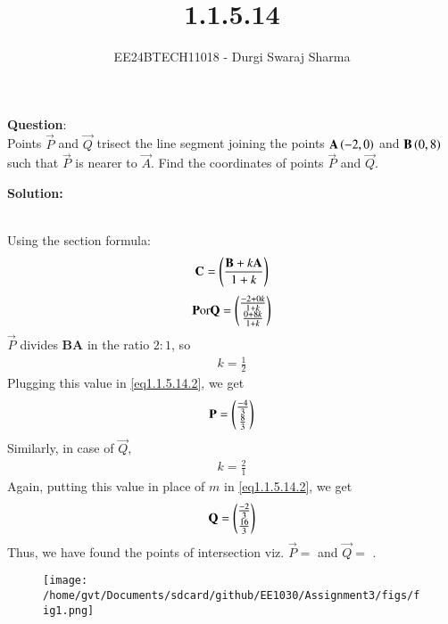 \documentclass[journal]{IEEEtran}
\begin{document}

\vspace{3cm}

\title{1.1.5.14}
\author{EE24BTECH11018 - Durgi Swaraj Sharma
}
{\let\newpage\relax\maketitle}

\renewcommand{\thefigure}{\theenumi}
\renewcommand{\thetable}{\theenumi}
\setlength{\intextsep}{10pt} %


\renewcommand{\thetable}{\theenumi}


 \textbf{Question}:\\
Points $\vec{P}$ and $\vec{Q}$ trisect the line segment joining the points $\mathbf{A}\left(-2, 0\right)$ and $\mathbf{B}\left(0, 8\right)$ such that $\vec{P}$ is nearer to $\vec{A}$. Find the coordinates of points $\vec{P}$ and $\vec{Q}$. \hfill {}

\textbf{Solution: }\\
    \begin{table}[h!]    
      \centering
      
      \caption{}
    \end{table}\\
 Using the section formula:
\begin{align}
	\mathbf{C} = \left(\frac{\mathbf{B}+k\mathbf{A}}{1+k}\right) \label{eq1.1.5.14.1}
\end{align}
\begin{align}
	\mathbf{P} \text{or} \mathbf{Q} = \begin{pmatrix}\frac{-2+0k}{1+k} \\ \frac{0+8k}{1+k}\end{pmatrix} \label{eq1.1.5.14.2}
\end{align}
$\vec{P}$ divides \textbf{BA} in the ratio $2:1$, so 
\begin{align}
	k = \frac{1}{2}
\end{align}
Plugging this value in \ref{eq1.1.5.14.2}, we get
\begin{align}
	\mathbf{P} = \begin{pmatrix}\frac{-4}{3} \\ \frac{8}{3}\end{pmatrix}
\end{align}
Similarly, in case of $\vec{Q}$,
\begin{align}
	k = \frac{2}{1}
\end{align}
Again, putting this value in place of $m$ in \ref{eq1.1.5.14.2}, we get
\begin{align}
	\mathbf{Q} = \begin{pmatrix}\frac{-2}{3} \\ \frac{16}{3}\end{pmatrix}
\end{align}
Thus, we have found the points of intersection viz. $\vec{P} =$  and $\vec{Q} =$ . 


    \begin{figure}[h]
        \centering
       \texttt{[image: /home/gvt/Documents/sdcard/github/EE1030/Assignment3/figs/fig1.png]}
       \caption{}
       \label{graph}
    \end{figure}
\end{document}
